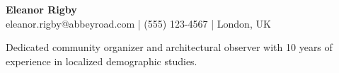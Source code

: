 \documentclass{article}
\begin{document}
\begin{center}
{\LARGE \textbf{Eleanor Rigby}} \\
\vspace{2mm}
eleanor.rigby@abbeyroad.com | (555) 123-4567 | London, UK
\end{center}
\vspace{5mm}
\noindent Dedicated community organizer and architectural observer with 10 years of experience in localized demographic studies.
\end{document}
